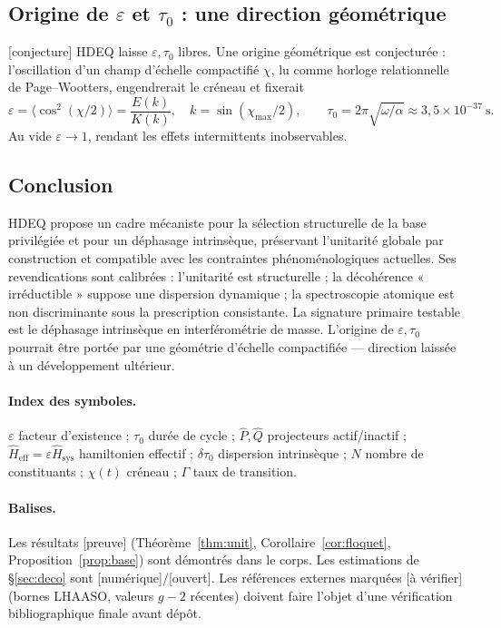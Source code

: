 \documentclass[11pt,a4paper]{article}
\newcommand{\Hsysop}{\hat{H}_{\mathrm{sys}}}
\newcommand{\Heff}{\hat{H}_{\mathrm{eff}}}
\newcommand{\statut}[1]{{\footnotesize\textsf{[#1]}}}
\theoremstyle{plain}
\theoremstyle{definition}
\theoremstyle{remark}
\begin{document}
\subsection{Origine de $\varepsilon$ et $\tau_0$ : une direction g\'eom\'etrique}
\statut{conjecture} HDEQ laisse $\varepsilon,\tau_0$ libres. Une origine g\'eom\'etrique
est conjectur\'ee : l'oscillation d'un champ d'\'echelle compactifi\'e $\chi$, lu comme
horloge relationnelle de Page--Wootters, engendrerait le cr\'eneau et fixerait
\[
\varepsilon=\langle\cos^2(\chi/2)\rangle=\frac{E(k)}{K(k)},\quad
k=\sin(\chi_{\max}/2),\qquad
\tau_0=2\pi\sqrt{\omega/\alpha}\approx3{,}5\times10^{-37}\ \mathrm{s}.
\]
Au vide $\varepsilon\to1$, rendant les effets intermittents inobservables.

\subsection{Conclusion}
HDEQ propose un cadre m\'ecaniste pour la s\'election structurelle de la base privil\'egi\'ee
et pour un d\'ephasage intrins\`eque, pr\'eservant l'unitarit\'e globale par construction et
compatible avec les contraintes ph\'enom\'enologiques actuelles. Ses revendications sont
calibr\'ees : l'unitarit\'e est structurelle ; la d\'ecoh\'erence « irr\'eductible » suppose une
dispersion dynamique ; la spectroscopie atomique est non discriminante sous la
prescription consistante. La signature primaire testable est le d\'ephasage intrins\`eque
en interf\'erom\'etrie de masse. L'origine de $\varepsilon,\tau_0$ pourrait \^etre port\'ee
par une g\'eom\'etrie d'\'echelle compactifi\'ee --- direction laiss\'ee \`a un d\'eveloppement
ult\'erieur.

\paragraph{Index des symboles.}
$\varepsilon$ facteur d'existence ; $\tau_0$ dur\'ee de cycle ; $\hat P,\hat Q$
projecteurs actif/inactif ; $\Heff=\varepsilon\Hsysop$ hamiltonien effectif ;
$\delta\tau_0$ dispersion intrins\`eque ; $N$ nombre de constituants ; $\chi(t)$
cr\'eneau ; $\Gamma$ taux de transition.

\paragraph{Balises.} Les r\'esultats \statut{preuve} (Th\'eor\`eme~\ref{thm:unit},
Corollaire~\ref{cor:floquet}, Proposition~\ref{prop:base}) sont d\'emontr\'es dans le
corps. Les estimations de \S\ref{sec:deco} sont \statut{num\'erique}/\statut{ouvert}.
Les r\'ef\'erences externes marqu\'ees \statut{\`a v\'erifier} (bornes LHAASO, valeurs $g-2$
r\'ecentes) doivent faire l'objet d'une v\'erification bibliographique finale avant d\'ep\^ot.
\end{document}
